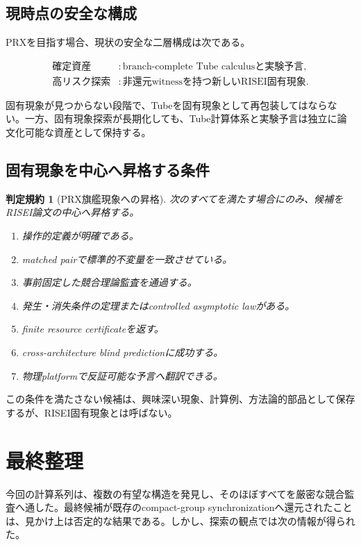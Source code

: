 \documentclass[11pt,a4paper,uplatex,dvipdfmx]{bxjsarticle}
\newtheorem{criterion}[definition]{判定規約}
\theoremstyle{remark}
\begin{document}
\subsection{現時点の安全な構成}

PRXを目指す場合、現状の安全な二層構成は次である。

\begin{align}
\text{確定資産} &: \text{branch-complete Tube calculusと実験予言},\\
\text{高リスク探索} &: \text{非還元witnessを持つ新しいRISEI固有現象}.
\end{align}

固有現象が見つからない段階で、Tubeを固有現象として再包装してはならない。一方、固有現象探索が長期化しても、Tube計算体系と実験予言は独立に論文化可能な資産として保持する。

\subsection{固有現象を中心へ昇格する条件}

\begin{criterion}[PRX旗艦現象への昇格]
次のすべてを満たす場合にのみ、候補をRISEI論文の中心へ昇格する。
\begin{enumerate}
  \item 操作的定義が明確である。
  \item matched pairで標準的不変量を一致させている。
  \item 事前固定した競合理論監査を通過する。
  \item 発生・消失条件の定理またはcontrolled asymptotic lawがある。
  \item finite resource certificateを返す。
  \item cross-architecture blind predictionに成功する。
  \item 物理platformで反証可能な予言へ翻訳できる。
\end{enumerate}
\end{criterion}

この条件を満たさない候補は、興味深い現象、計算例、方法論的部品として保存するが、RISEI固有現象とは呼ばない。

\section{最終整理}

今回の計算系列は、複数の有望な構造を発見し、そのほぼすべてを厳密な競合監査へ通した。最終候補が既存のcompact-group synchronizationへ還元されたことは、見かけ上は否定的な結果である。しかし、探索の観点では次の情報が得られた。
\end{document}
